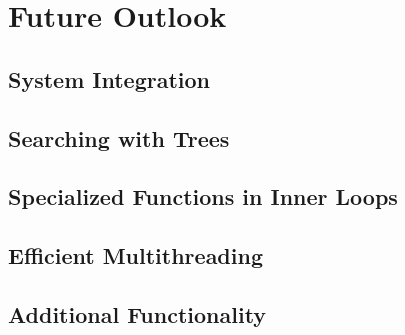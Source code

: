 \section{Future Outlook}\label{sec:flowy2-future}
	\subsection{System Integration}\label{subsec:system-integration}
	\subsection{Searching with Trees}\label{subsec:search-trees} 
	\subsection{Specialized Functions in Inner Loops}\label{subsec:special-fns}
	\subsection{Efficient Multithreading}\label{subsec:multithreading}
	\subsection{Additional Functionality}\label{subsec:additional-functionality}